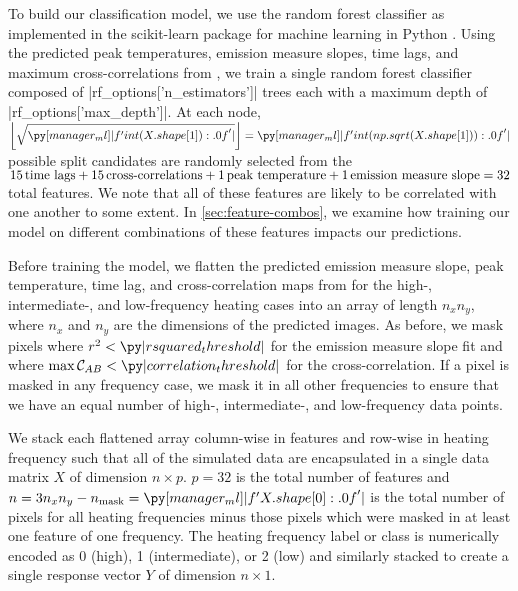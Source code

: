 To build our classification model, we use the random forest classifier as implemented in the scikit-learn package for machine learning in Python \citep{pedregosa_scikit-learn_2011}.
Using the predicted peak temperatures, emission measure slopes, time lags, and maximum cross-correlations from , we train a single random forest classifier composed of \py[manager_ml]|rf_options['n_estimators']| trees each with a maximum depth of \py[manager_ml]|rf_options['max_depth']|.
At each node, $\left\lfloor\sqrt{\py[manager_ml]|f'{int(X.shape[1]):.0f}'|}\right\rfloor=\py[manager_ml]|f'{int(np.sqrt(X.shape[1])):.0f}'|$ possible split candidates are randomly selected from the $15\,\textup{time lags} + 15\,\textup{cross-correlations} + 1\,\textup{peak temperature} + 1\,\textup{emission measure slope}=32$ total features.
We note that all of these features are likely to be correlated with one another to some extent.
In \autoref{sec:feature-combos}, we examine how training our model on different combinations of these features impacts our predictions.

Before training the model, we flatten the predicted emission measure slope, peak temperature, time lag, and cross-correlation maps from  for the high-, intermediate-, and low-frequency heating cases into an array of length $n_xn_y$, where $n_x$ and $n_y$ are the dimensions of the predicted images.
As before, we mask pixels where $r^2<\py|rsquared_threshold|$ for the emission measure slope fit and where $\max\mathcal{C}_{AB}<\py|correlation_threshold|$ for the cross-correlation.
If a pixel is masked in any frequency case, we mask it in all other frequencies to ensure that we have an equal number of high-, intermediate-, and low-frequency data points.

We stack each flattened array column-wise in features and row-wise in heating frequency such that all of the simulated data are encapsulated in a single data matrix $X$ of dimension $n\times p$.
$p=32$ is the total number of features and $n=3n_xn_y - n_\textup{mask}=\py[manager_ml]|f'{X.shape[0]:.0f}'|$ is the total number of pixels for all heating frequencies minus those pixels which were masked in at least one feature of one frequency.
The heating frequency label or class is numerically encoded as 0 (high), 1 (intermediate), or 2 (low) and similarly stacked to create a single response vector $Y$ of dimension $n\times1$.

